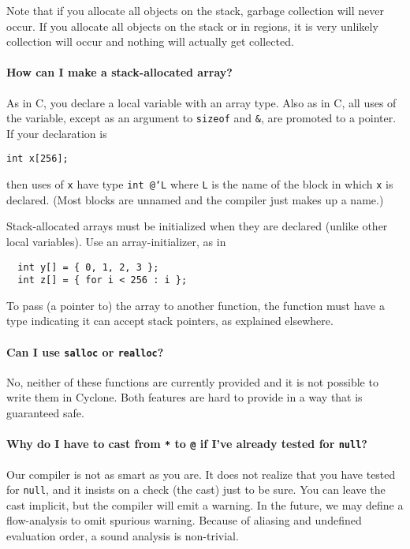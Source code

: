 Note that if you allocate all objects on the stack, garbage collection
will never occur.  If you allocate all objects on the stack or in
regions, it is very unlikely collection will occur and nothing will
actually get collected.

\paragraph{How can I make a stack-allocated array?}

As in C, you declare a local variable with an array type.  Also as in
C, all uses of the variable, except as an argument to \texttt{sizeof}
and \texttt{\&}, are promoted to a pointer.  If your declaration is
\begin{verbatim}
int x[256];
\end{verbatim}
then uses of \texttt{x} have type \texttt{int @`L\rb} where
\texttt{L} is the name of the block in which \texttt{x} is declared.
(Most blocks are unnamed and the compiler just makes up a name.)

Stack-allocated arrays must be initialized when they are declared
(unlike other local variables).  Use an array-initializer, as in
\begin{verbatim}
  int y[] = { 0, 1, 2, 3 };
  int z[] = { for i < 256 : i };
\end{verbatim}

To pass (a pointer to) the array to another function, the function
must have a type indicating it can accept stack pointers, as explained
elsewhere.

\paragraph{Can I use \texttt{salloc} or \texttt{realloc}?}

No, neither of these functions are currently provided and it is not
possible to write them in Cyclone.  Both features are hard to provide
in a way that is guaranteed safe.

\paragraph{Why do I have to cast from \texttt{*} to \texttt{@} if I've
  already tested for \texttt{null}?} 

Our compiler is not as smart as you are.  It does not realize that you
have tested for \texttt{null}, and it insists on a check (the cast)
just to be sure.  You can leave the cast implicit, but the compiler
will emit a warning.  In the future, we may define a flow-analysis to
omit spurious warning.  Because of aliasing and undefined evaluation
order, a sound analysis is non-trivial.

